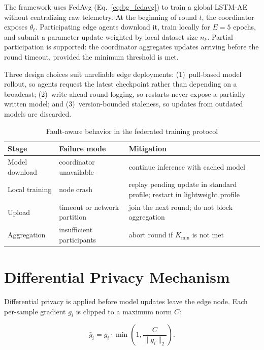 The framework uses FedAvg (Eq.~\ref{eq:bg_fedavg}) to train a global LSTM-AE
without centralizing raw telemetry. At the beginning of round $t$, the
coordinator exposes $\theta_t$. Participating edge agents download it, train
locally for $E=5$ epochs, and submit a parameter update weighted by local
dataset size $n_k$. Partial participation is supported: the coordinator
aggregates updates arriving before the round timeout, provided the minimum
threshold is met.

Three design choices suit unreliable edge deployments: (1)~pull-based model
rollout, so agents request the latest checkpoint rather than depending on a
broadcast; (2)~write-ahead round logging, so restarts never expose a partially
written model; and (3)~version-bounded staleness, so updates from outdated
models are discarded.

\begin{table}[H]
    \centering
    \small
    \begin{tabular}{|p{}|p{}|p{}|}
        \hline
        \textbf{Stage} & \textbf{Failure mode} & \textbf{Mitigation} \\
        \hline
        Model download & coordinator unavailable & continue inference with
        cached model \\
        \hline
        Local training & node crash & replay pending update in standard
        profile; restart in lightweight profile \\
        \hline
        Upload & timeout or network partition & join the next round; do not
        block aggregation \\
        \hline
        Aggregation & insufficient participants & abort round if
        $K_{\min}$ is not met \\
        \hline
    \end{tabular}
    \caption{Fault-aware behavior in the federated training protocol}
    \label{tab:fl_failures}
\end{table}

\section{Differential Privacy Mechanism}
\label{sec:method_dp}

Differential privacy is applied before model updates leave the edge node. Each
per-sample gradient $g_i$ is clipped to a maximum norm $C$:

\begin{equation}
    \bar{g}_i =
    g_i \cdot \min\left(1,\frac{C}{\|g_i\|_2}\right).
    \label{eq:method_clip}
\end{equation}

